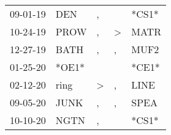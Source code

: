 \begin{supertabular}{p{0.07\textwidth}p{0.06\textwidth}p{0.02\textwidth}p{0.02\textwidth}p{0.06\textwidth}}
          09-01-19\textsuperscript{} &            DEN\textsuperscript{} &                , &                  &                            *CS1* \\
          10-24-19\textsuperscript{} &           PROW\textsuperscript{} &                , &     \textgreater &           MATR\textsuperscript{} \\
          12-27-19\textsuperscript{} &           BATH\textsuperscript{} &                , &                , &           MUF2\textsuperscript{} \\
          01-25-20\textsuperscript{} &                            *OE1* &                  &                  &                            *CE1* \\
          02-12-20\textsuperscript{} &           ring\textsuperscript{} &     \textgreater &                , &           LINE\textsuperscript{} \\
          09-05-20\textsuperscript{} &           JUNK\textsuperscript{} &                , &                , &           SPEA\textsuperscript{} \\
          10-10-20\textsuperscript{} &           NGTN\textsuperscript{} &                , &                  &                            *CS1* \\
\end{supertabular}
